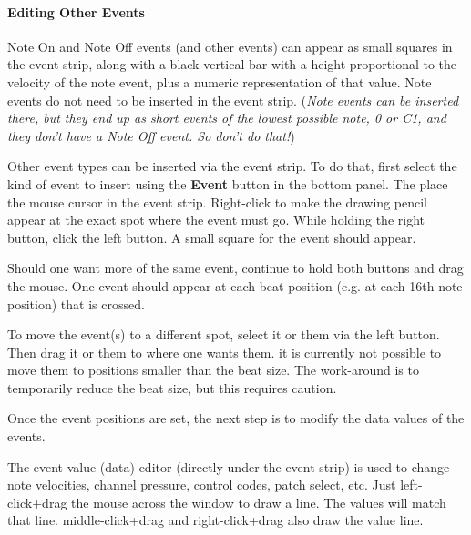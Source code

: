 \paragraph{Editing Other Events}
\label{paragraph:seq64_pattern_editor_other_events}


   Note On and Note Off events (and other events) can appear as small
   squares in the event strip, along with a black vertical bar with a height
   proportional to the
   velocity of the note event, plus a numeric representation of that value.
   Note events do not need to be inserted in the event strip.
   (\textsl{Note events can be inserted there, but they end up as short
   events of the lowest possible note, 0 or C1, and they don't have a Note
   Off event.  So don't do that!})

   Other event types can be inserted via the event strip.  To do that, first
   select the kind of event to insert using the \textbf{Event} button in the
   bottom panel.  The place the mouse cursor in the event strip.
   Right-click to make the drawing pencil appear at the exact spot where the
   event must go.  While holding the right button, click the left button.
   A small square for the event should appear.

   Should one want more of the same event, continue to hold both buttons and
   drag the mouse.  One event should appear at each beat position (e.g. at
   each 16th note position) that is crossed.

   To move the event(s) to a different spot, select it or them via the left
   button.  Then drag it or them to where one wants them.
   it is currently not possible to move them to positions smaller than the
   beat size.  The work-around is to temporarily reduce the beat size,
   but this requires caution.

   Once the event positions are set, the next step is to modify the
   data values of the events.

	The event value (data) editor (directly under the event strip) is used 
	to change note velocities, channel pressure, control codes,
	patch select, etc.
   Just left-click+drag the mouse across the window to draw a line.  The
   values will match that line.  
   middle-click+drag and right-click+drag also
   draw the value line.

